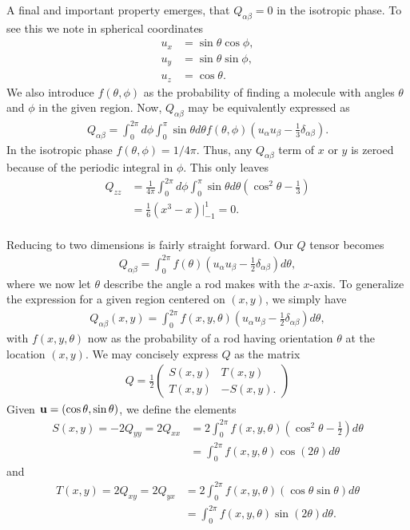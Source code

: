 A final and important property emerges, that $Q_{\alpha\beta} = 0$ in the isotropic phase. To see this we note in spherical coordinates
\begin{align*}
	u_x &= \sin\theta\cos\phi,\\
	u_y &= \sin\theta\sin\phi,\\
	u_z &= \cos\theta.
\end{align*}
We also introduce $f(\theta,\phi)$ as the probability of finding a molecule with angles $\theta$ and $\phi$ in the given region. Now, $Q_{\alpha\beta}$ may be equivalently expressed as
\begin{align*}
	Q_{\alpha\beta} = \int_0^{2\pi}d\phi \int_0^\pi \sin\theta d\theta f(\theta,\phi)\left( u_\alpha u_\beta - \frac{1}{3}\delta_{\alpha\beta}\right).
\end{align*}
In the isotropic phase $f(\theta,\phi) = 1/4\pi$. Thus, any $Q_{\alpha\beta}$ term of $x$ or $y$ is zeroed because of the periodic integral in $\phi$. This only leaves
\begin{align*}
	Q_{zz} &= \frac{1}{4\pi}\int_0^{2\pi}d\phi
	\int_0^\pi \sin\theta d\theta\left(\cos^2\theta - \frac{1}{3}\right)\\
	&= \frac{1}{6}\left(x^3 - x\right)\Big|_{-1}^1 = 0.\\
\end{align*}

Reducing to two dimensions is fairly straight forward. Our $Q$ tensor becomes
\begin{align}
	Q_{\alpha\beta} = \int_0^{2\pi}f(\theta)\left( 
	u_{\alpha}u_\beta - \frac{1}{2}\delta_{\alpha\beta} \right) d\theta,
\end{align}
where we now let $\theta$ describe the angle a rod makes with the $x$-axis. To generalize the expression for a given region centered on $(x,y)$, we simply have
\begin{align}
Q_{\alpha\beta}(x,y) = \int_0^{2\pi}f(x,y,\theta)\left( 
u_{\alpha}u_\beta - \frac{1}{2}\delta_{\alpha\beta} \right) d\theta,
\end{align}
with $f(x,y,\theta)$ now as the probability of a rod having orientation $\theta$ at the location $(x,y)$. We may concisely express $Q$ as the matrix
\begin{align}
	Q = \frac{1}{2}\left(
	\begin{matrix}
	S(x,y) & T(x,y)\\
	T(x,y) & -S(x,y).
	\end{matrix}
	\right)
\end{align}
Given $\mathbf{u} = (\cos\theta,\sin\theta)$, we define the elements
\begin{align}
	\nonumber
	S(x,y) = -2Q_{yy} = 2Q_{xx} &= 2\int_0^{2\pi} f(x,y,\theta)\left( \cos^2\theta - \frac{1}{2}\right) d\theta\\
	&= \int_0^{2\pi}
	f(x,y,\theta)\cos(2\theta)d\theta
\end{align}
and
\begin{align}
	\nonumber
	T(x,y) = 2Q_{xy} = 2Q_{yx} &= 2\int_0^{2\pi} f(x,y,\theta)\left( \cos\theta\sin\theta \right) d\theta\\
	&= \int_0^{2\pi}
	f(x,y,\theta)\sin(2\theta) d\theta.
\end{align}

